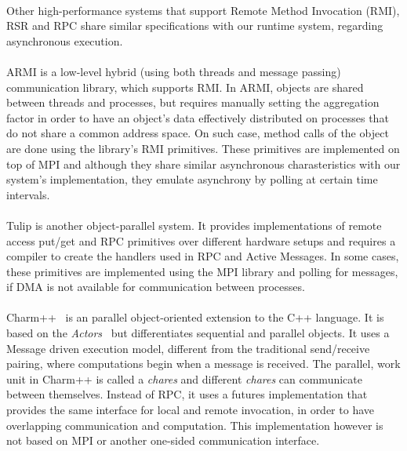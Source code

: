 \paragraph{}
Other high-performance systems that support Remote Method Invocation (RMI), RSR and RPC share similar specifications
with our runtime system, regarding asynchronous execution.

\paragraph{}
ARMI\cite{Saunders:2003:AAP:966049.781534} is a low-level hybrid (using both threads and message passing) communication library, 
which supports RMI.  In ARMI, objects are shared between threads and processes, but requires manually setting the aggregation
factor in order to have an object's data effectively distributed on processes that do not share a common address space.  On such
case, method calls of the object are done using the library's RMI primitives.  These primitives are implemented on top of MPI and
although they share similar asynchronous charasteristics with our system's implementation, they emulate asynchrony by polling 
at certain time intervals.

\paragraph{}
Tulip\cite{Beckman96tulip:a} is another object-parallel system.  It provides implementations of remote access put/get and RPC 
primitives
over different hardware setups and requires a compiler to create the handlers used in RPC and Active Messages.  In some cases, 
these primitives are implemented using the MPI library and polling for messages, if DMA is not available for communication
between processes.

\paragraph{}
Charm++~\cite{Kale93charm++:a} is an parallel object-oriented extension to the C++ language.  It is based on the 
\emph{Actors}~\cite{conf/icpp/HouckA92} but differentiates sequential and parallel objects.  
It uses a Message driven execution model,
different from the traditional send/receive pairing, where computations begin when a message is received.  The parallel,
work unit in Charm++ is called a \emph{chares} and different \emph{chares} can communicate between themselves.  Instead
of RPC, it uses a futures implementation that provides the same interface for local and remote invocation, in order to have overlapping communication and computation.  This implementation however is not based on MPI or another one-sided 
communication interface.

